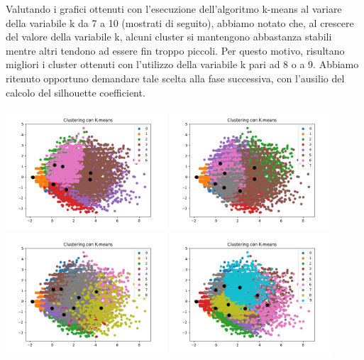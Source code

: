 \documentclass[a4paper, 10pt]{report}
\begin{document}
                Valutando i grafici ottenuti con l'esecuzione dell'algoritmo k-means al variare della variabile k da 7 a 10 (mostrati di seguito),
                abbiamo notato che, al crescere del valore della variabile k, alcuni cluster si mantengono abbastanza stabili mentre altri
                tendono ad essere fin troppo piccoli. Per questo motivo, risultano migliori i cluster ottenuti con l'utilizzo
                della variabile k pari ad 8 o a 9.
                Abbiamo ritenuto opportuno demandare tale scelta alla fase successiva, con l'ausilio del calcolo del silhouette coefficient.
                \begin{center}
                    \includegraphics[width=6cm]{evaluation/k=7}
                    \includegraphics[width=6cm]{evaluation/k=8} \\
                    \includegraphics[width=6cm]{evaluation/k=9}
                    \includegraphics[width=6cm]{evaluation/k=10}
                \end{center}
\end{document}
